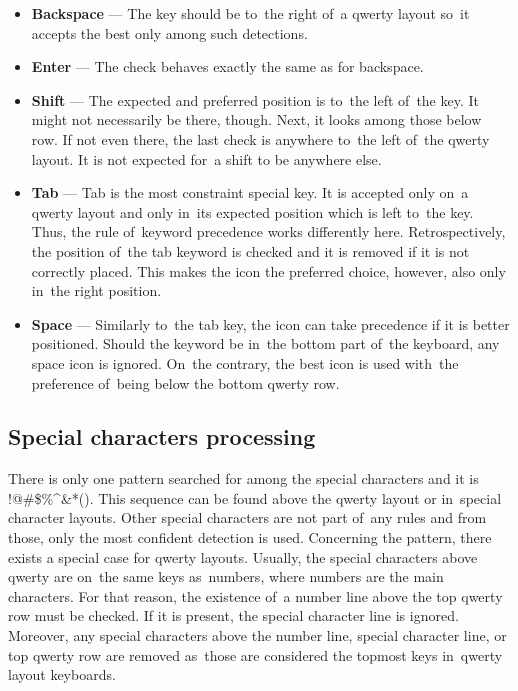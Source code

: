 \begin{itemize}[topsep=0pt,itemsep=-1.5pt,partopsep=6pt]
  \item \textbf{Backspace} --- The key should be to~the right of~a qwerty layout so~it accepts the best only among such detections.
  \item \textbf{Enter} --- The check behaves exactly the same as for backspace.
  \item \textbf{Shift} --- The expected and preferred position is to~the left of~the  key. It might not necessarily be there, though. Next, it looks among those below  row. If not even there, the last check is anywhere to~the left of~the qwerty layout. It is not expected for~a shift to be anywhere else.
  \item \textbf{Tab} --- Tab is the most constraint special key. It is accepted only on~a qwerty layout and only in~its expected position which is left to~the  key. Thus, the rule of~keyword precedence works differently here. Retrospectively, the position of~the tab keyword is checked and it is removed if it is not correctly placed. This makes the icon the preferred choice, however, also only in~the right position.
  \item \textbf{Space} --- Similarly to~the tab key, the icon can take precedence if it is better positioned. Should the keyword be in~the bottom part of~the keyboard, any space icon is ignored. On~the contrary, the best icon is used with~the preference of~being below the bottom qwerty row.
\end{itemize}

\subsection{Special characters processing}
\label{postprocessing-special-chars}
There is only one pattern searched for among the special characters and it is !@\#\$\%\^{}\&*(). This sequence can be found above the qwerty layout or in~special character layouts. Other special characters are not part of~any rules and from those, only the most confident detection is used. Concerning the pattern, there exists a special case for qwerty layouts. Usually, the special characters above qwerty are on~the same keys as~numbers, where numbers are the main characters. For that reason, the existence of~a number line above the top qwerty row must be checked. If it is present, the special character line is ignored. Moreover, any special characters above the number line, special character line, or top qwerty row are removed as~those are considered the topmost keys in~qwerty layout keyboards.

